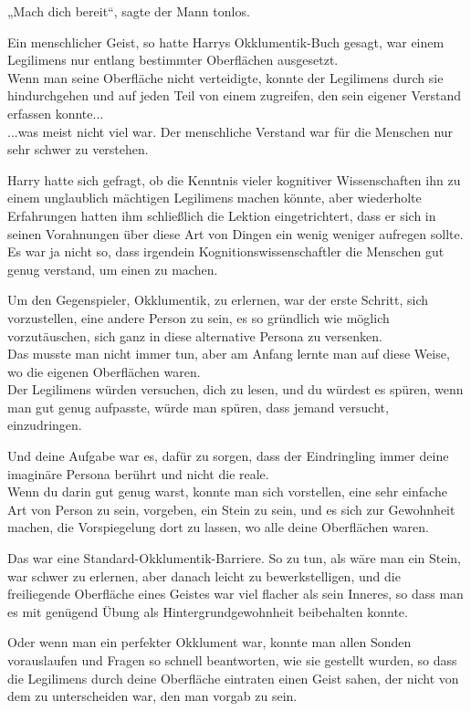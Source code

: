 {„Mach dich bereit“, sagte der Mann tonlos.

Ein menschlicher Geist, so hatte Harrys Okklumentik-Buch gesagt, war einem Legilimens nur entlang bestimmter Oberflächen ausgesetzt.\\ Wenn man seine Oberfläche nicht verteidigte, konnte der Legilimens durch sie hindurchgehen und auf jeden Teil von einem zugreifen, den sein eigener Verstand erfassen konnte...\\ ...was meist nicht viel war. Der menschliche Verstand war für die Menschen nur sehr schwer zu verstehen.

Harry hatte sich gefragt, ob die Kenntnis vieler kognitiver Wissenschaften ihn zu einem unglaublich mächtigen Legilimens machen könnte, aber wiederholte Erfahrungen hatten ihm schließlich die Lektion eingetrichtert, dass er sich in seinen Vorahnungen über diese Art von Dingen ein wenig weniger aufregen sollte.\\ Es war ja nicht so, dass irgendein Kognitionswissenschaftler die Menschen gut genug verstand, um einen zu machen.

Um den Gegenspieler, Okklumentik, zu erlernen, war der erste Schritt, sich vorzustellen, eine andere Person zu sein, es so gründlich wie möglich vorzutäuschen, sich ganz in diese alternative Persona zu versenken.\\ Das musste man nicht immer tun, aber am Anfang lernte man auf diese Weise, wo die eigenen Oberflächen waren.\\ Der Legilimens würden versuchen, dich zu lesen, und du würdest es spüren, wenn man gut genug aufpasste, würde man spüren, dass jemand versucht, einzudringen.

Und deine Aufgabe war es, dafür zu sorgen, dass der Eindringling immer deine imaginäre Persona berührt und nicht die reale.\\ Wenn du darin gut genug warst, konnte man sich vorstellen, eine sehr einfache Art von Person zu sein, vorgeben, ein Stein zu sein, und es sich zur Gewohnheit machen, die Vorspiegelung dort zu lassen, wo alle deine Oberflächen waren.

Das war eine Standard-Okklumentik-Barriere. So zu tun, als wäre man ein Stein, war schwer zu erlernen, aber danach leicht zu bewerkstelligen, und die freiliegende Oberfläche eines Geistes war viel flacher als sein Inneres, so dass man es mit genügend Übung als Hintergrundgewohnheit beibehalten konnte.

Oder wenn man ein perfekter Okklument war, konnte man allen Sonden vorauslaufen und Fragen so schnell beantworten, wie sie gestellt wurden, so dass die Legilimens durch deine Oberfläche eintraten einen Geist sahen, der nicht von dem zu unterscheiden war, den man vorgab zu sein.

}

